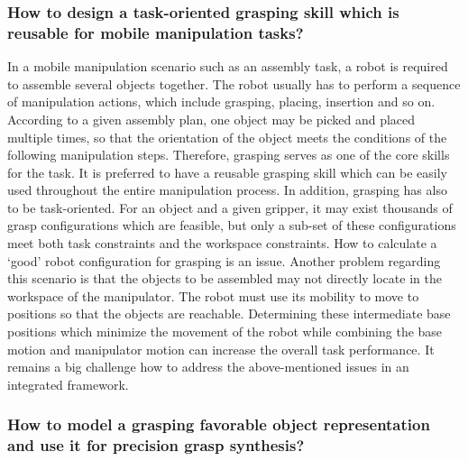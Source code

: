 \subsubsection{How to design a task-oriented grasping skill which is reusable for mobile manipulation tasks?}

In a mobile manipulation scenario such as an assembly task, a robot is required to assemble several objects together. The robot usually has to perform a sequence of manipulation actions, which include grasping, placing, insertion and so on. According to a given assembly plan, one object may be picked and placed multiple times, so that the orientation of the object meets the conditions of the following manipulation steps. Therefore, grasping serves as one of the core skills for the task. It is preferred to have a reusable grasping skill which can be easily used throughout the entire manipulation process. In addition, grasping has also to be task-oriented. For an object and a given gripper, it may exist thousands of grasp configurations which are feasible, but only a sub-set of these configurations meet both  task constraints and the workspace constraints. How to calculate a `good' robot configuration for grasping is an issue. Another problem regarding this scenario is that the objects to be assembled may not directly locate in the workspace of the manipulator. The robot must use its mobility to move to positions so that the objects are reachable. Determining these intermediate base positions which minimize the movement of the robot while combining the base motion and manipulator motion can increase the overall task performance. It remains a big challenge how to address the above-mentioned issues in an integrated framework. 

\subsubsection{How to model a grasping favorable object representation and use it for precision grasp synthesis?}

